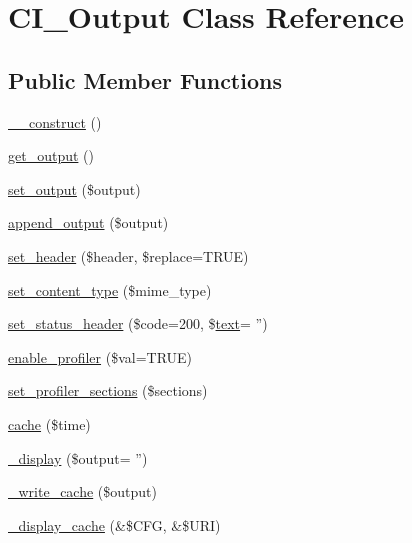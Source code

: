 \hypertarget{class_c_i___output}{\section{C\-I\-\_\-\-Output Class Reference}
\label{class_c_i___output}
}
\subsection*{Public Member Functions}
\begin{DoxyCompactItemize}
\item 
\hyperlink{class_c_i___output_a095c5d389db211932136b53f25f39685}{\-\_\-\-\_\-construct} ()
\item 
\hyperlink{class_c_i___output_aa6c3f8688f804de4f1af8a462fffb922}{get\-\_\-output} ()
\item 
\hyperlink{class_c_i___output_afcff30d791a8006216f5c2fe93a95983}{set\-\_\-output} (\$output)
\item 
\hyperlink{class_c_i___output_a7c79b8239d6ecbba0c8fdd00bb619651}{append\-\_\-output} (\$output)
\item 
\hyperlink{class_c_i___output_a270389a1636faa81eda5ef3fa900ea25}{set\-\_\-header} (\$header, \$replace=T\-R\-U\-E)
\item 
\hyperlink{class_c_i___output_a7ab03763a8ef83963392436dc416be86}{set\-\_\-content\-\_\-type} (\$mime\-\_\-type)
\item 
\hyperlink{class_c_i___output_ae5416517aea15ac6c9136ce83002002f}{set\-\_\-status\-\_\-header} (\$code=200, \$\hyperlink{mathquill_8js_afd670572c010bca545fd3952276dd249}{text}= '')
\item 
\hyperlink{class_c_i___output_a7bd693db25952e1b074630f52ee67500}{enable\-\_\-profiler} (\$val=T\-R\-U\-E)
\item 
\hyperlink{class_c_i___output_ac5e50de443748cf3d356d29eba2caaaf}{set\-\_\-profiler\-\_\-sections} (\$sections)
\item 
\hyperlink{class_c_i___output_a6eae3cd828cf30926d44f1ab6011f939}{cache} (\$time)
\item 
\hyperlink{class_c_i___output_a16a22fa40f70c2b611fa9dd7e2a63ef1}{\-\_\-display} (\$output= '')
\item 
\hyperlink{class_c_i___output_a772aa9eb3f60f66fa194443ca0bdd8a4}{\-\_\-write\-\_\-cache} (\$output)
\item 
\hyperlink{class_c_i___output_acce78bdac02df9ab196a9c5939f6c4ab}{\-\_\-display\-\_\-cache} (\&\$C\-F\-G, \&\$U\-R\-I)
\end{DoxyCompactItemize}
